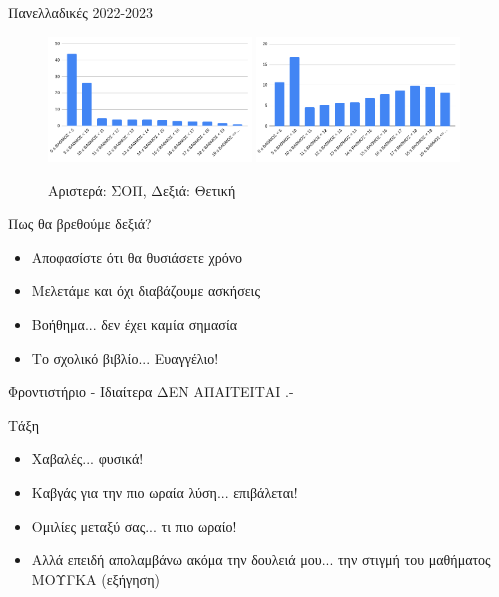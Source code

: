 \documentclass{presentation}
\begin{document}
\begin{frame}{Πανελλαδικές 2022-2023}
      \begin{figure}
            \centering
            \includegraphics[width=0.48\textwidth]{"images/panelladikes22sop.png"}
            \includegraphics[width=0.48\textwidth]{"images/panelladikes22thet.png"}
            \caption{Αριστερά: ΣΟΠ, Δεξιά: Θετική}
      \end{figure}
\end{frame}

\begin{frame}{Πως θα βρεθούμε δεξιά?}
      \begin{itemize}
            \item Αποφασίστε ότι θα θυσιάσετε χρόνο \pause
            \item Μελετάμε και όχι διαβάζουμε ασκήσεις \pause
            \item Βοήθημα... δεν έχει καμία σημασία \pause
            \item Το σχολικό βιβλίο... Ευαγγέλιο!
      \end{itemize}
\end{frame}

\begin{frame}{Φροντιστήριο - Ιδιαίτερα}
      \centering
      ΔΕΝ ΑΠΑΙΤΕΙΤΑΙ .-

\end{frame}

\begin{frame}{Τάξη}
      \begin{itemize}
            \item Χαβαλές... φυσικά! \pause
            \item Καβγάς για την πιο ωραία λύση... επιβάλεται! \pause
            \item Ομιλίες μεταξύ σας... τι πιο ωραίο! \pause
            \item Αλλά επειδή απολαμβάνω ακόμα την δουλειά μου... την στιγμή του μαθήματος ΜΟΥΓΚΑ (εξήγηση)
      \end{itemize}
\end{frame}
\end{document}
